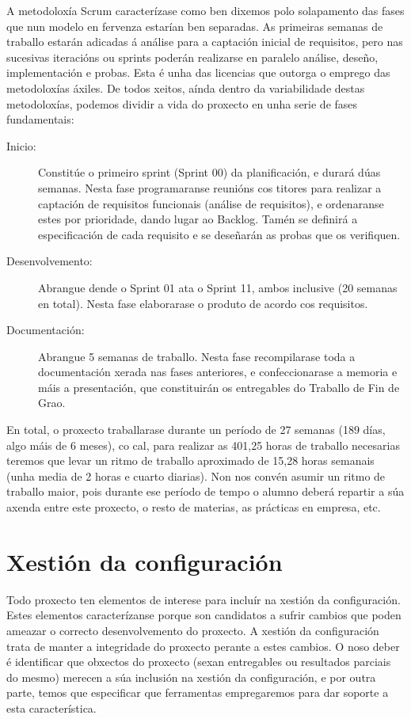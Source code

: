 A metodoloxía Scrum caracterízase como ben dixemos polo solapamento das fases que nun modelo en fervenza estarían ben separadas. As primeiras semanas de traballo estarán adicadas á análise para a captación inicial de requisitos, pero nas sucesivas iteracións ou sprints poderán realizarse en paralelo análise, deseño, implementación e probas. Esta é unha das licencias que outorga o emprego das metodoloxías áxiles. De todos xeitos, aínda dentro da variabilidade destas metodoloxías, podemos dividir a vida do proxecto en unha serie de fases fundamentais:
\begin{description}
\item[Inicio:] Constitúe o primeiro sprint (Sprint 00) da planificación, e durará dúas semanas. Nesta fase programaranse reunións cos titores para realizar a captación de requisitos funcionais (análise de requisitos), e ordenaranse estes por prioridade, dando lugar ao Backlog. Tamén se definirá a especificación de cada requisito e se deseñarán as probas que os verifiquen.
\item[Desenvolvemento:] Abrangue dende o Sprint 01 ata o Sprint 11, ambos inclusive (20 semanas en total). Nesta fase elaborarase o produto de acordo cos requisitos.
\item[Documentación:] Abrangue 5 semanas de traballo. Nesta fase recompilarase toda a documentación xerada nas fases anteriores, e confeccionarase a memoria e máis a presentación, que constituirán os entregables do Traballo de Fin de Grao.
\end{description}

En total, o proxecto traballarase durante un período de 27 semanas (189 días, algo máis de 6 meses), co cal, para realizar as 401,25 horas de traballo necesarias teremos que levar un ritmo de traballo aproximado de 15,28 horas semanais (unha media de 2 horas e cuarto diarias). Non nos convén asumir un ritmo de traballo maior, pois durante ese período de tempo o alumno deberá repartir a súa axenda entre este proxecto, o resto de materias, as prácticas en empresa, etc.

\section{Xestión da configuración}

Todo proxecto ten elementos de interese para incluír na xestión da configuración. Estes elementos caracterízanse porque son candidatos a sufrir cambios que poden ameazar o correcto desenvolvemento do proxecto. A xestión da configuración trata de manter a integridade do proxecto perante a estes cambios. O noso deber é identificar que obxectos do proxecto (sexan entregables ou resultados parciais do mesmo) merecen a súa inclusión na xestión da configuración, e por outra parte, temos que especificar que ferramentas empregaremos para dar soporte a esta característica.

